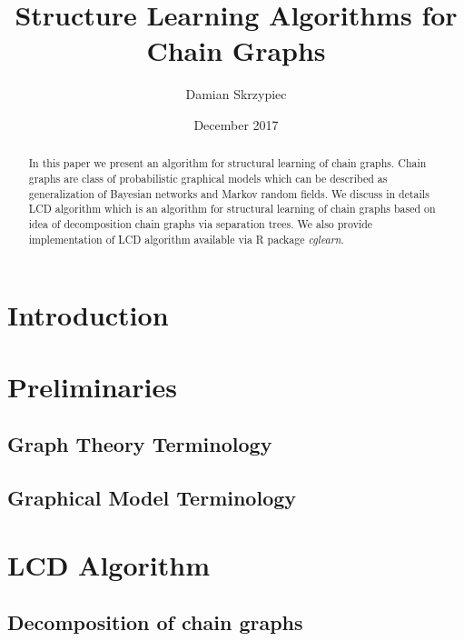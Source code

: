 \documentclass{pracamgr}
\author{Damian Skrzypiec}
\title{Structure Learning Algorithms for Chain Graphs}
\date{December 2017}
\theoremstyle{definition}
\begin{document}
\maketitle

\begin{abstract}
	In this paper we present an algorithm for structural learning of chain graphs. Chain graphs 
	are class of probabilistic graphical models which can be described as generalization of Bayesian networks and 
	Markov random fields. We discuss in details LCD algorithm which is an algorithm for structural learning of
	chain graphs based on idea of decomposition chain graphs via separation trees. We also provide implementation
	of LCD algorithm available via R package \textit{cglearn}. 
\end{abstract}

\tableofcontents
\listoffigures
\listofalgorithms
{}

\chapter{Introduction}




\chapter{Preliminaries}\label{r:prelim}

	\section{Graph Theory Terminology}\label{r:defGraph}
		
		
	\section{Graphical Model Terminology}\label{r:defGraphModel}
		


\chapter{LCD Algorithm} \label{chap:LCDAlg}

	

	\section{Decomposition of chain graphs}
		
		
\end{document}
